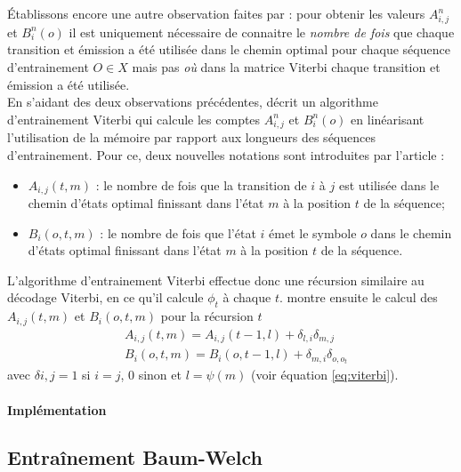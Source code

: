 \documentclass[letterpaper]{article}
\begin{document}
Établissons encore une autre observation faites par \cite{LM} : pour obtenir les valeurs $A_{i,j}^n$ et $B_i^n(o)$ il est uniquement nécessaire de connaitre le \textit{nombre de fois} que chaque transition et émission a été utilisée dans le chemin optimal pour chaque séquence d'entrainement $O \in X$ mais pas \textit{où} dans la matrice Viterbi chaque transition et émission a été utilisée. \\

En s'aidant des deux observations précédentes, \cite{LM} décrit un algorithme d'entrainement Viterbi qui calcule les comptes $A_{i,j}^n$ et $B_i^n(o)$ en linéarisant l'utilisation de la mémoire par rapport aux longueurs des séquences d'entrainement. Pour ce, deux nouvelles notations sont introduites par l'article : 
\begin{itemize}
	\item $A_{i,j}(t, m)$ : le nombre de fois que la transition de $i$ à $j$ est utilisée dans le chemin d'états optimal finissant dans l'état $m$ à la position $t$ de la séquence; 
	\item $B_i(o, t, m)$ : le nombre de fois que l'état $i$ émet le symbole $o$ dans le chemin d'états optimal finissant dans l'état $m$ à la position $t$ de la séquence. \\
\end{itemize} 

L'algorithme d'entrainement Viterbi effectue donc une récursion similaire au décodage Viterbi, en ce qu'il calcule $\phi_t$ à chaque $t$. \cite{LM} montre ensuite le calcul des  $A_{i,j}(t, m)$ et $B_i(o, t, m)$ pour la récursion $t$
\begin{equation}
\begin{aligned}
	& A_{i,j}(t, m) = A_{i,j}(t-1, l) + \delta_{l,i}\delta_{m,j} \\
	& B_i(o, t, m) = B_i(o, t-1, l) + \delta_{m,i}\delta_{o,o_t}
\end{aligned}
\end{equation}
avec $\delta{i,j} = 1$ si $i=j$, 0 sinon et $l = \psi(m)$ (voir équation \ref{eq:viterbi}).

\paragraph{Implémentation}
\subsection{Entraînement Baum-Welch}
\end{document}
